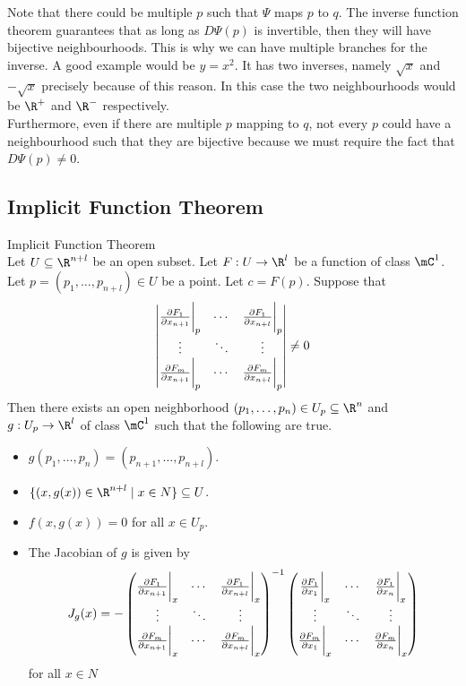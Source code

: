 \documentclass[a4paper]{article}
\begin{document}
Note that there could be multiple $p$ such that $\Psi$ maps $p$ to $q$. The inverse function theorem guarantees that as long as $D\Psi(p)$ is invertible, then they will have bijective neighbourhoods. This is why we can have multiple branches for the inverse. A good example would be $y=x^2$. It has two inverses, namely $\sqrt{x}$ and $-\sqrt{x}$ precisely because of this reason. In this case the two neighbourhoods would be $\R^+$ and $\R^-$ respectively. \\

Furthermore, even if there are multiple $p$ mapping to $q$, not every $p$ could have a neighbourhood such that they are bijective because we must require the fact that $D\Psi(p)\neq 0$. 

\subsection{Implicit Function Theorem}
\begin{thm}{Implicit Function Theorem}{}\\
Let $U\subseteq\R^{n+l}$ be an open subset. Let $F:U\to\R^l$ be a function of class $\mC^1$. Let $p=(p_1,\dots,p_{n+l})\in U$ be a point. Let $c=F(p)$. Suppose that $$\begin{vmatrix}
\frac{\partial F_1}{\partial x_{n+1}}\bigg{|}_p & \cdots & \frac{\partial F_1}{\partial x_{n+l}}\bigg{|}_p\\
\vdots & \ddots & \vdots\\
\frac{\partial F_m}{\partial x_{n+1}}\bigg{|}_p & \cdots & \frac{\partial F_m}{\partial x_{n+l}}\bigg{|}_p
\end{vmatrix}\neq 0$$
Then there exists an open neighborhood $(p_1,\dots,p_n)\in U_p\subseteq\R^n$ and $g:U_p\to\R^l$ of class $\mC^1$ such that the following are true. 
\begin{itemize}
\item $g(p_1,\dots,p_n)=(p_{n+1},\dots,p_{n+l})$. 
\item $\{(x,g(x))\in\R^{n+l}\;|\;x\in N\}\subseteq U$. 
\item $f(x,g(x))=0$ for all $x\in U_p$. 
\item The Jacobian of $g$ is given by $$J_g(x)=-\begin{pmatrix}
\frac{\partial F_1}{\partial x_{n+1}}\bigg{|}_x & \cdots & \frac{\partial F_1}{\partial x_{n+l}}\bigg{|}_x\\
\vdots & \ddots & \vdots\\
\frac{\partial F_m}{\partial x_{n+1}}\bigg{|}_x & \cdots & \frac{\partial F_m}{\partial x_{n+l}}\bigg{|}_x
\end{pmatrix}^{-1}\begin{pmatrix}
\frac{\partial F_1}{\partial x_1}\bigg{|}_x & \cdots & \frac{\partial F_1}{\partial x_n}\bigg{|}_x\\
\vdots & \ddots & \vdots\\
\frac{\partial F_m}{\partial x_1}\bigg{|}_x & \cdots & \frac{\partial F_m}{\partial x_n}\bigg{|}_x
\end{pmatrix}$$ for all $x\in N$
\end{itemize}
\end{thm}
\end{document}

